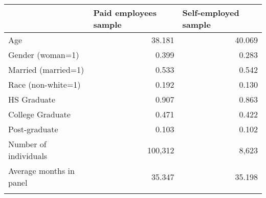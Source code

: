 \begin{tabular}{rrr}
\toprule
      & \multicolumn{1}{l}{Paid employees sample} & \multicolumn{1}{l}{Self-employed sample} \\
\midrule
\multicolumn{1}{l}{Age} & 38.181 & 40.069 \\
\multicolumn{1}{l}{Gender (woman=1)} & 0.399 & 0.283 \\
\multicolumn{1}{l}{Married (married=1)} & 0.533 & 0.542 \\
\multicolumn{1}{l}{Race (non-white=1)} & 0.192 & 0.130 \\
\multicolumn{1}{l}{HS Graduate} & 0.907 & 0.863 \\
\multicolumn{1}{l}{College Graduate} & 0.471 & 0.422 \\
\multicolumn{1}{l}{Post-graduate} & 0.103 & 0.102 \\
\midrule
\multicolumn{1}{l}{Number of individuals} &                                100,312  &                                     8,623  \\
\multicolumn{1}{l}{Average months in panel} & 35.347 & 35.198 \\
\midrule
      &       &  \\
\end{tabular}%
